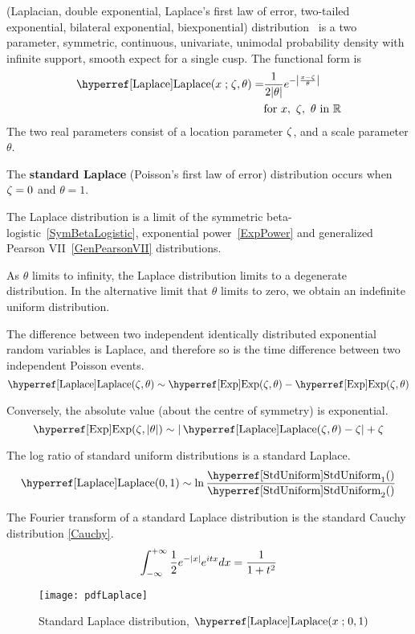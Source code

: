

\label{sec:Laplace}
 (Laplacian, double exponential, Laplace's first law of error, two-tailed exponential, bilateral exponential, biexponential) distribution~\cite{Laplace1774,Stigler1986,Kotz2001}
 is  a two parameter, symmetric, continuous, univariate, unimodal probability density with infinite support, smooth expect for a single cusp.
The functional form is
\begin{align}
\label{Laplace}
\opr{Laplace}(x\given \pLoc, \theta) = & 
\frac{1}{2 |\theta|} e^{- \left| \frac{x-\pLoc}{\theta}\right|} 		\checked
\\
\notag
& \text{for } x,\ \pLoc,\  \theta \text{ in }  \mathbb{R}			\checked
\end{align}
The two real parameters consist of a location parameter $\zeta$,  and a scale parameter $\theta$.




The {\bf standard Laplace} (Poisson's first law of error) distribution occurs when $\zeta=0$ and $\theta=1$.




The Laplace distribution is a limit of the symmetric beta-logistic~\eqref{SymBetaLogistic}, exponential power~\eqref{ExpPower} and generalized Pearson VII~\eqref{GenPearsonVII} distributions.

As $\theta$ limits to infinity, the Laplace distribution limits to a degenerate distribution. In the alternative limit that $\theta$ limits to zero, we obtain an indefinite uniform distribution.


The difference between two independent identically distributed exponential random variables is Laplace, and therefore so is the time difference between two independent Poisson events.
\[
\opr{Laplace}(\pLoc, \theta) \sim  \opr{Exp}(\pLoc,\theta) - \opr{Exp}(\pLoc,\theta)
\]

Conversely, the absolute value (about the centre of symmetry) is exponential. 
\[
\opr{Exp}(\pLoc, |\theta|) \sim  |\opr{Laplace}(\pLoc,\theta) - \pLoc | +\pLoc
\]


The log ratio of standard uniform distributions is a standard Laplace.
\[
\opr{Laplace}(0,1) \sim \ln \frac{\opr{StdUniform}_1() }{\opr{StdUniform}_2()} \checked
\]


The Fourier transform of a standard Laplace distribution is the standard Cauchy distribution \eqref{Cauchy}.
\[
\int_{-\infty}^{+\infty} \frac{1}{2}e^{-| x |} e^{i t x} dx = \frac{1}{1+t^2}
\checked
\]



\begin{figure}[t!]
\begin{center}
\texttt{[image: pdfLaplace]}
\end{center}
\caption[Standard Laplace distribution]{Standard Laplace distribution, $\opr{Laplace}(x\given 0,1)$}
\end{figure}



